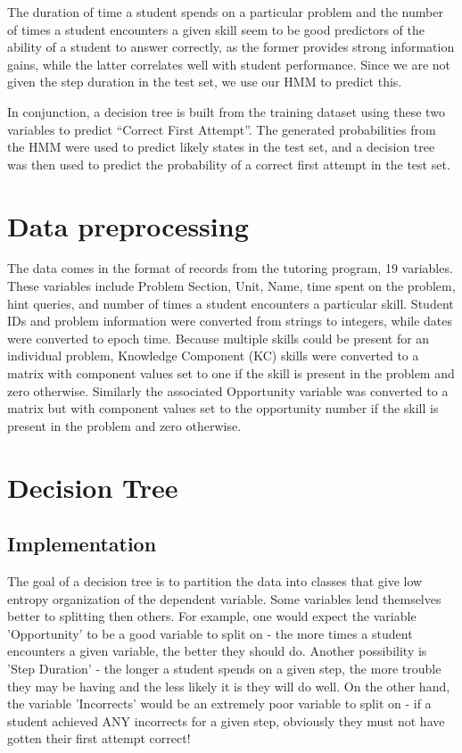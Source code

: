 \documentclass{article} %
\begin{document}
The duration of time a student spends on a particular problem and the number of times a student encounters a given skill seem to be good predictors of the ability of a student to answer correctly, as the former provides strong information gains, while the latter correlates well with student performance. Since we are not given the step duration in the test set, we use our HMM to predict this.

In conjunction, a decision tree is built from the training dataset using these two variables to predict “Correct First Attempt”. The generated probabilities from the HMM were used to predict likely states in the test set, and a decision tree was then used to predict the probability of a correct first attempt in the test set.


\section{Data preprocessing}
The data comes in the format of records from the tutoring program, 19 variables. These variables include Problem Section, Unit, Name, time spent on the problem, hint queries, and number of times a student encounters a particular skill. Student IDs and problem information were converted from strings to integers, while dates were converted to epoch time. Because multiple skills could be present for an individual problem, Knowledge Component (KC) skills were converted to a matrix with component values set to one if the skill is present in the problem and zero otherwise. Similarly the associated Opportunity variable was converted to a matrix but with component values set to the opportunity number if the skill is present in the problem and zero otherwise.

\section{Decision Tree}
\subsection{Implementation}
The goal of a decision tree is to partition the data into classes that give low entropy organization of the dependent variable. Some variables lend themselves better to splitting then others. For example, one would expect the variable 'Opportunity' to be a good variable to split on - the more times a student encounters a given variable, the better they should do. Another possibility is 'Step Duration' - the longer a student spends on a given step, the more trouble they may be having and the less likely it is they will do well. On the other hand, the variable 'Incorrects' would be an extremely poor variable to split on - if a student achieved ANY incorrects for a given step, obviously they must not have gotten their first attempt correct!
\end{document}
